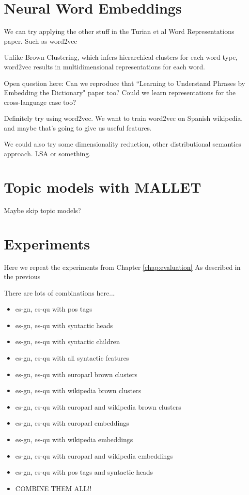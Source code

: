 \section{Neural Word Embeddings}

We can try applying the other stuff in the Turian et al Word Representations
paper. Such as word2vec \cite{mikolovword2vec}

Unlike Brown Clustering, which infers hierarchical clusters for each word type,
word2vec results in multidimensional representations for each word.

Open question here:
Can we reproduce that ``Learning to Understand Phrases by Embedding the
Dictionary" paper too? Could we learn representations for the cross-language
case too?

Definitely try using word2vec. We want to train word2vec on Spanish wikipedia,
and maybe that's going to give us useful features.

We could also try some dimensionality reduction, other distributional semantics
approach. LSA or something.

\section{Topic models with MALLET}
Maybe skip topic models?

\section{Experiments}
Here we repeat the experiments from Chapter \ref{chap:evaluation}
As described in the previous

There are lots of combinations here...

\begin{itemize}
  \item es-gn, es-qu with pos tags
  \item es-gn, es-qu with syntactic heads
  \item es-gn, es-qu with syntactic children
  \item es-gn, es-qu with all syntactic features
\end{itemize}

\begin{itemize}
  \item es-gn, es-qu with europarl brown clusters
  \item es-gn, es-qu with wikipedia brown clusters
  \item es-gn, es-qu with europarl and wikipedia brown clusters
\end{itemize}

\begin{itemize}
  \item es-gn, es-qu with europarl embeddings
  \item es-gn, es-qu with wikipedia embeddings
  \item es-gn, es-qu with europarl and wikipedia embeddings
  \item es-gn, es-qu with pos tags and syntactic heads
\end{itemize}

\begin{itemize}
  \item COMBINE THEM ALL!!
\end{itemize}

